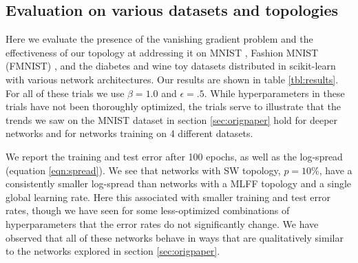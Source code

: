 \documentclass[utf8]{frontiersSCNS}
\begin{document}
\subsection{Evaluation on various datasets and topologies}
\label{sec:comparison}

Here we evaluate the presence of the vanishing gradient problem and the effectiveness of our topology at addressing it on MNIST \citep{mnist1998}, Fashion MNIST (FMNIST) \citep{fmnist2017}, and the diabetes and wine toy datasets distributed in scikit-learn \citep{sklearn2011} with various network architectures. Our results are shown in table \ref{tbl:results}. For all of these trials we use $\beta=1.0$ and $\epsilon=.5$. While hyperparameters in these trials have not been thoroughly optimized, the trials serve to illustrate that the trends we saw on the MNIST dataset in section \ref{sec:origpaper} hold for deeper networks and for networks training on 4 different datasets.

We report the training and test error after 100 epochs, as well as the log-spread (equation \ref{eqn:spread}). We see that networks with SW topology, $p=10\%$, have a consistently smaller log-spread than networks with a MLFF topology and a single global learning rate. Here this associated with smaller training and test error rates, though we have seen for some less-optimized combinations of hyperparameters that the error rates do not significantly change. We have observed that all of these networks behave in ways that are qualitatively similar to the networks explored in section \ref{sec:origpaper}.
\end{document}
